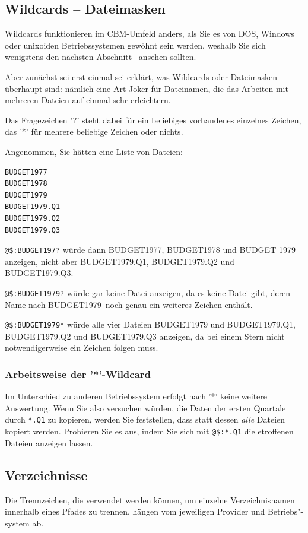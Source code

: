 \documentclass[10pt,a4paper]{scrartcl}		%
\begin{document}
\subsection{Wildcards -- Dateimasken}
Wildcards funktionieren im CBM-Umfeld anders, als Sie es von DOS,
Windows oder unixoiden Betriebssystemen gewöhnt sein werden, weshalb 
Sie sich wenigstens den nächsten Abschnitt \glqq {}\grqq\ 
ansehen sollten.

Aber zunächst sei erst einmal sei erklärt, was Wildcards oder Dateimasken 
überhaupt sind: nämlich
eine Art Joker für Dateinamen, die das Arbeiten mit mehreren Dateien
auf einmal sehr erleichtern.

Das Fragezeichen '?' steht dabei für ein beliebiges vorhandenes einzelnes 
Zeichen, das '*' für mehrere beliebige Zeichen oder nichts.

Angenommen, Sie hätten eine Liste von Dateien:

\begin{verbatim}
BUDGET1977
BUDGET1978
BUDGET1979
BUDGET1979.Q1
BUDGET1979.Q2
BUDGET1979.Q3
\end{verbatim}

\texttt{@\$:BUDGET197?} würde dann BUDGET1977, BUDGET1978 und BUDGET 1979
anzeigen, nicht aber BUDGET1979.Q1, BUDGET1979.Q2 und BUDGET1979.Q3.

\texttt{@\$:BUDGET1979?} würde gar keine Datei anzeigen, da es keine
Datei gibt, deren Name nach \glqq BUDGET1979\grqq\ noch genau ein
weiteres Zeichen enthält.

\texttt{@\$:BUDGET1979*} würde alle vier Dateien BUDGET1979 und 
BUDGET1979.Q1, BUDGET1979.Q2 und BUDGET1979.Q3 anzeigen, da bei
einem Stern nicht notwendigerweise ein Zeichen folgen muss.

\subsubsection*{Arbeitsweise der '*'-Wildcard}
\label{starwc}
Im Unterschied zu anderen Betriebssystem erfolgt nach '*' keine
weitere Auswertung. Wenn Sie also versuchen würden, die Daten
der ersten Quartale durch \texttt{*.Q1} zu kopieren, werden Sie
feststellen, dass statt dessen \textit{alle} Dateien kopiert werden.
Probieren Sie es aus, indem Sie sich mit \texttt{@\$:*.Q1} die
etroffenen Dateien anzeigen lassen.

\subsection{Verzeichnisse}
Die Trennzeichen, die verwendet werden können, um einzelne 
Verzeichnisnamen innerhalb eines Pfades zu trennen, hängen vom
jeweiligen Provider und Betriebs"-system ab. 
\end{document}
